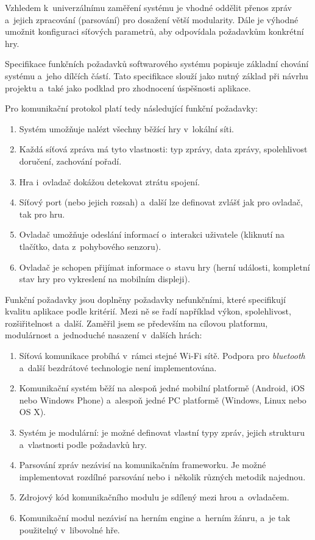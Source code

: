 \documentclass[thesis=B,czech,hidelinks]{FITthesis}[2012/06/26] %
\begin{document}
Vzhledem k~univerzálnímu zaměření systému je vhodné oddělit přenos zpráv a~jejich zpracování (parsování) pro dosažení větší modularity. Dále je výhodné umožnit  konfiguraci síťových parametrů, aby odpovídala požadavkům konkrétní hry.

Specifikace funkčních požadavků softwarového systému popisuje základní chování systému a~jeho dílčích částí. Tato specifikace slouží jako nutný základ při návrhu projektu a~také jako podklad pro zhodnocení úspěšnosti aplikace. \cite{pozadavky}

Pro komunikační protokol platí tedy následující funkční požadavky:

\begin{enumerate}
	\item Systém umožňuje nalézt všechny běžící hry v~lokální síti.
	\item Každá síťová zpráva má tyto vlastnosti: typ zprávy, data zprávy, spolehlivost doručení, zachování pořadí.
	\item Hra i~ovladač dokážou detekovat ztrátu spojení.
	\item Síťový port (nebo jejich rozsah) a~další lze definovat zvlášť jak pro ovladač, tak pro hru.
	\item Ovladač umožňuje odeslání informací o~interakci uživatele (kliknutí na tlačítko, data z~pohybového senzoru).
	\item Ovladač je schopen přijímat informace o~stavu hry (herní události, kompletní stav hry pro vykreslení na mobilním displeji).
\end{enumerate}

Funkční požadavky jsou doplněny požadavky nefunkčními, které specifikují kvalitu aplikace podle kritérií. Mezi ně se řadí například výkon, spolehlivost, rozšiřitelnost a~další. Zaměřil jsem se především na cílovou platformu, modulárnost a~jednoduché nasazení v~dalších hrách:

\begin{enumerate}
	\item Síťová komunikace probíhá v~rámci stejné Wi-Fi sítě. Podpora pro \textit{blue\-tooth} a~další bezdrátové technologie není implementována.
	\item Komunikační systém běží na alespoň jedné mobilní platformě (Android, iOS nebo Windows Phone) a~alespoň jedné PC platformě (Windows, Linux nebo OS X).
	\item Systém je modulární: je možné definovat vlastní typy zpráv, jejich strukturu a~vlastnosti podle požadavků hry.
	\item Parsování zpráv nezávisí na komunikačním frameworku. Je možné implementovat rozdílné parsování nebo i~několik různých metodik najednou.
	\item Zdrojový kód komunikačního modulu je sdílený mezi hrou a~ovladačem.
	\item Komunikační modul nezávisí na herním engine a~herním žánru, a~je tak použitelný v~libovolné hře.
\end{enumerate}
\end{document}
